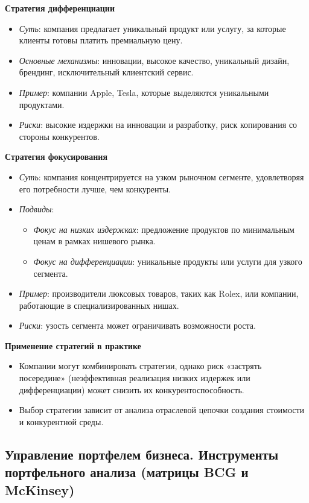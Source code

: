 \textbf{Стратегия дифференциации}
\begin{itemize}
    \item \textit{Суть}: компания предлагает уникальный продукт или услугу, за которые клиенты готовы платить премиальную цену.
    \item \textit{Основные механизмы}: инновации, высокое качество, уникальный дизайн, брендинг, исключительный клиентский сервис.
    \item \textit{Пример}: компании Apple, Tesla, которые выделяются уникальными продуктами.
    \item \textit{Риски}: высокие издержки на инновации и разработку, риск копирования со стороны конкурентов.
\end{itemize}

\textbf{Стратегия фокусирования}
\begin{itemize}
    \item \textit{Суть}: компания концентрируется на узком рыночном сегменте, удовлетворяя его потребности лучше, чем конкуренты.
    \item \textit{Подвиды}:
    \begin{itemize}
        \item \textit{Фокус на низких издержках}: предложение продуктов по минимальным ценам в рамках нишевого рынка.
        \item \textit{Фокус на дифференциации}: уникальные продукты или услуги для узкого сегмента.
    \end{itemize}
    \item \textit{Пример}: производители люксовых товаров, таких как Rolex, или компании, работающие в специализированных нишах.
    \item \textit{Риски}: узость сегмента может ограничивать возможности роста.
\end{itemize}

\textbf{Применение стратегий в практике}
\begin{itemize}
    \item Компании могут комбинировать стратегии, однако риск «застрять посередине» (неэффективная реализация низких издержек или дифференциации) может снизить их конкурентоспособность.
    \item Выбор стратегии зависит от анализа отраслевой цепочки создания стоимости и конкурентной среды.
\end{itemize}

\pagebreak
\subsection{Управление портфелем бизнеса. Инструменты портфельного анализа (матрицы BCG и McKinsey)}


